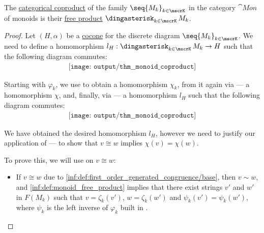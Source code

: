 \begin{proposition}\label{thm:monoid_coproduct}
  The \hyperref[def:discrete_category_limits]{categorical coproduct} of the family \( \seq{ M_k }_{k \in \mscrK} \) in the category \hyperref[def:monoid/category]{\( \cat{Mon} \)} of monoids is their \hyperref[def:monoid_free_product]{free product} \( \Ast_{k \in \mscrK} M_k \).
\end{proposition}
\begin{proof}
  Let \( (H, \alpha) \) be a \hyperref[def:category_of_cones/cocone]{cocone} for the discrete diagram \( \seq{ M_k }_{k \in \mscrK} \). We need to define a homomorphism \( l_H: \Ast_{k \in \mscrK} M_k \to H \) such that the following diagram commutes:
  \begin{equation*}
    \begin{aligned}
      \texttt{[image: output/thm\_\_monoid\_coproduct]}
    \end{aligned}
  \end{equation*}

  Starting with \( \varphi_k \), we use  to obtain a homomorphism \( \chi_k \), from it again via  --- a homomorphism \( \chi \), and, finally, via  --- a homomorphism \( l_H \) such that the following diagram commutes:
  \begin{equation*}
    \begin{aligned}
      \texttt{[image: output/thm\_\_monoid\_coproduct]}
    \end{aligned}
  \end{equation*}

  We have obtained the desired homomorphism \( l_H \), however we need to justify our application of  --- to show that \( v \cong w \) implies \( \chi(v) = \chi(w) \).

  To prove this, we will use  on \( v \cong w \):
  \begin{itemize}
    \item If \( v \cong w \) due to \ref{inf:def:first_order_generated_congruence/base}, then \( v \sim w \), and \ref{inf:def:monoid_free_product} implies that there exist strings \( v' \) and \( w' \) in \( F(M_k) \)  such that \( v = \zeta_k(v') \), \( w = \zeta_k(w') \) and \( \psi_k(v') = \psi_k(w') \), where \( \psi_k \) is the left inverse of \( \varphi_k \) built in .


\end{itemize}
\end{proof}
